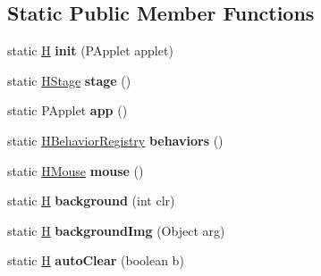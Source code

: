 \subsection*{Static Public Member Functions}
\begin{DoxyCompactItemize}
\item 
\hypertarget{classhype_1_1util_1_1_h_a715d0295b19cd87c4abd31649874e2db}{static \hyperlink{classhype_1_1util_1_1_h}{H} {\bfseries init} (P\-Applet applet)}\label{classhype_1_1util_1_1_h_a715d0295b19cd87c4abd31649874e2db}

\item 
\hypertarget{classhype_1_1util_1_1_h_a546fb07e757b926d3d35c9df84344fb3}{static \hyperlink{classhype_1_1drawable_1_1_h_stage}{H\-Stage} {\bfseries stage} ()}\label{classhype_1_1util_1_1_h_a546fb07e757b926d3d35c9df84344fb3}

\item 
\hypertarget{classhype_1_1util_1_1_h_af3feb9f401a52531f8e9863b6037bca7}{static P\-Applet {\bfseries app} ()}\label{classhype_1_1util_1_1_h_af3feb9f401a52531f8e9863b6037bca7}

\item 
\hypertarget{classhype_1_1util_1_1_h_a15be690e44f0bff8993dd56076533049}{static \hyperlink{classhype_1_1behavior_1_1_h_behavior_registry}{H\-Behavior\-Registry} {\bfseries behaviors} ()}\label{classhype_1_1util_1_1_h_a15be690e44f0bff8993dd56076533049}

\item 
\hypertarget{classhype_1_1util_1_1_h_acd583485bc081dad1348a972c1451272}{static \hyperlink{classhype_1_1event_1_1_h_mouse}{H\-Mouse} {\bfseries mouse} ()}\label{classhype_1_1util_1_1_h_acd583485bc081dad1348a972c1451272}

\item 
\hypertarget{classhype_1_1util_1_1_h_a0470663ee53fc2608a63b1c2467d1e9a}{static \hyperlink{classhype_1_1util_1_1_h}{H} {\bfseries background} (int clr)}\label{classhype_1_1util_1_1_h_a0470663ee53fc2608a63b1c2467d1e9a}

\item 
\hypertarget{classhype_1_1util_1_1_h_a52d44145dedccfdc092bab8a58e82117}{static \hyperlink{classhype_1_1util_1_1_h}{H} {\bfseries background\-Img} (Object arg)}\label{classhype_1_1util_1_1_h_a52d44145dedccfdc092bab8a58e82117}

\item 
\hypertarget{classhype_1_1util_1_1_h_a70d309725aff47fd409068afd9f98e6c}{static \hyperlink{classhype_1_1util_1_1_h}{H} {\bfseries auto\-Clear} (boolean b)}\label{classhype_1_1util_1_1_h_a70d309725aff47fd409068afd9f98e6c}


\end{DoxyCompactItemize}

